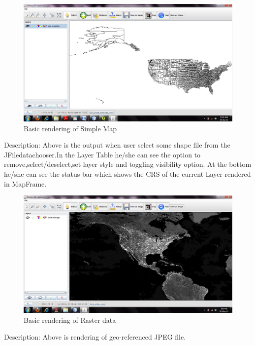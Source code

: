 \newpage
\begin{figure}[h]
\begin{center}
  \includegraphics[scale=0.43] {3.jpg}
  \caption[Screenshot - View Shapefile]{Basic rendering of Simple Map}
\end{center}
\end{figure}
Description: Above is the output when user select some shape file from the JFiledatachooser.In the Layer Table he/she can see the option to remove,select/deselect,set layer style and toggling visibility option. At the bottom he/she can see the status bar which shows the CRS of the current Layer rendered in MapFrame.

\newpage


\begin{figure}[h]
\begin{center}
  \includegraphics[scale=0.43] {4.jpg}
  \caption[Screenshot - View Image]{Basic rendering of Raster data}
\end{center}
\end{figure}
Description: Above is rendering of geo-referenced JPEG file.

